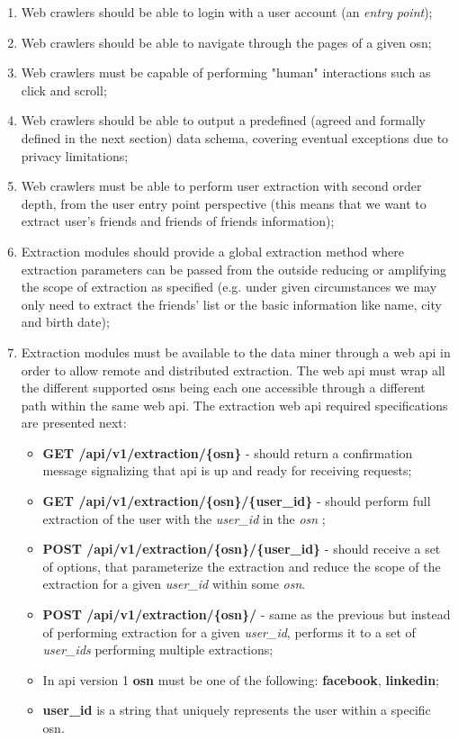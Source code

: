 \begin{enumerate}
    \item Web crawlers should be able to login with a user account (an \textit{entry point});
    \item Web crawlers should be able to navigate through the pages of a given \gls{osn};
    \item Web crawlers must be capable of performing "human" interactions such as click and scroll;
    \item Web crawlers should be able to output a predefined (agreed and formally defined in the next section) data schema, covering eventual
    exceptions due to privacy limitations;
    \item Web crawlers must be able to perform user extraction with second order depth, from the user entry point perspective (this means that we want to extract user's friends and friends of friends information);
    \item Extraction modules should provide a global extraction method where extraction parameters can be passed from the outside reducing or amplifying the scope of extraction as specified (e.g. under given circumstances we may only need to extract the friends' list or the basic information like name, city and birth date);
    \item Extraction modules must be available to the data miner through a web \gls{api} in order to allow remote and distributed extraction. The web \gls{api} must wrap all the different supported \glspl{osn} being each one accessible through a different path within the same web \gls{api}. The extraction web \gls{api} required specifications are presented next:
    \begin{itemize}
        \item \textbf{GET /api/v1/extraction/\{osn\}} - should return a confirmation message signalizing that \gls{api} is up and ready for receiving requests;
        \item \textbf{GET /api/v1/extraction/\{osn\}/\{user\_id\}} - should perform full extraction of the user with the \textit{user\_id} in the \textit{osn} ;
        \item \textbf{POST /api/v1/extraction/\{osn\}/\{user\_id\}} - should receive a set of options, that parameterize the extraction and reduce the scope of the extraction for a given \textit{user\_id} within some \textit{osn}.
        \item \textbf{POST /api/v1/extraction/\{osn\}/} - same as the previous but instead of performing extraction for a given \textit{user\_id}, performs it to a set of \textit{user\_ids} performing multiple extractions;
        \item In \gls{api} version 1 \textbf{osn} must be one of the following: \textbf{facebook}, \textbf{linkedin};
        \item \textbf{user\_id} is a string that uniquely represents the user within a specific \gls{osn}.
    \end{itemize}
\end{enumerate}

